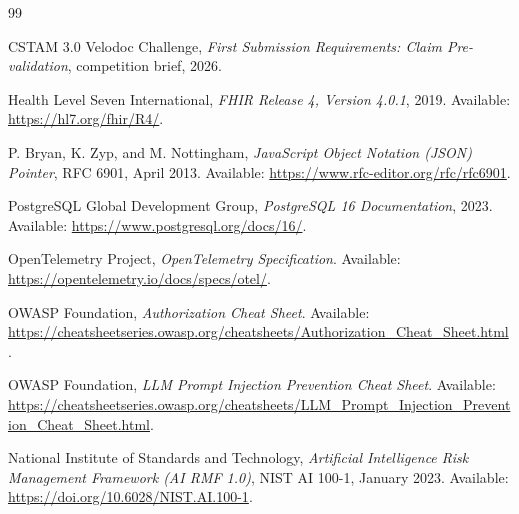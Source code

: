 \documentclass[11pt,a4paper,oneside]{report}
\begin{document}
\clearpage
{}
\begin{thebibliography}{99}

CSTAM 3.0 Velodoc Challenge, \emph{First Submission Requirements: Claim Pre-validation}, competition brief, 2026.

Health Level Seven International, \emph{FHIR Release 4, Version 4.0.1}, 2019. Available: \url{https://hl7.org/fhir/R4/}.

P. Bryan, K. Zyp, and M. Nottingham, \emph{JavaScript Object Notation (JSON) Pointer}, RFC 6901, April 2013. Available: \url{https://www.rfc-editor.org/rfc/rfc6901}.

PostgreSQL Global Development Group, \emph{PostgreSQL 16 Documentation}, 2023. Available: \url{https://www.postgresql.org/docs/16/}.

OpenTelemetry Project, \emph{OpenTelemetry Specification}. Available: \url{https://opentelemetry.io/docs/specs/otel/}.

OWASP Foundation, \emph{Authorization Cheat Sheet}. Available: \url{https://cheatsheetseries.owasp.org/cheatsheets/Authorization_Cheat_Sheet.html}.

OWASP Foundation, \emph{LLM Prompt Injection Prevention Cheat Sheet}. Available: \url{https://cheatsheetseries.owasp.org/cheatsheets/LLM_Prompt_Injection_Prevention_Cheat_Sheet.html}.

National Institute of Standards and Technology, \emph{Artificial Intelligence Risk Management Framework (AI RMF 1.0)}, NIST AI 100-1, January 2023. Available: \url{https://doi.org/10.6028/NIST.AI.100-1}.

\end{thebibliography}
\end{document}
